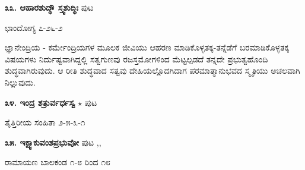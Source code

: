 \medskip
\noindent\textbf{೩೩. ಆಹಾರಶುದ್ಧೌ ಸ್ತ್ವಶುದ್ಧಿಃ} \hfill ಪುಟ \pageref{76}

\hfill ಛಾಂದೋಗ್ಯ ೭-೨೬-೨

ಜ್ಞಾನೇಂದ್ರಿಯ - ಕರ್ಮೇಂದ್ರಿಯಗಳ ಮೂಲಕ ಜೀವಿಯು ಆಹರಣ ಮಾಡಿಕೊಳ್ಳತಕ್ಕ-ತನ್ನೆಡೆಗೆ ಬರಮಾಡಿಕೊಳ್ಳತಕ್ಕ ವಿಷಯಗಳು ನಿರ್ದುಷ್ಟವಾಗಿದ್ದಲ್ಲಿ ಸತ್ವಗುಣವು ರಜಸ್ತಮೋಗಳಿಂದ ಮೆಟ್ಟಲ್ಪಡದೆ ತನ್ನದೇ ಪ್ರಭುತ್ವಹೊಂದಿ ಶುದ್ಧವಾಗಿರುವುದು. ಆ ರೀತಿ ಶುದ್ಧವಾದ ಸತ್ವವು ದೇಹಿಯಲ್ಲೊದಗಿದಾಗ ಪರಮಾತ್ಮಾನುಭವದ ಸ್ಮೃತಿಯು ಅಚಲವಾಗಿ ನಿಲ್ಲುವುದು.

\medskip
\noindent\textbf{೩೪. ಇಂದ್ರ  ಶತ್ರುರ್ವರ್ಧಸ್ವ} $\star$ \hfill ಪುಟ \pageref{9}

\hfill ತೈತ್ತಿರೀಯ ಸಂಹಿತಾ ೨-೫-೩-೧

\medskip
\noindent\textbf{೩೫. ಇಕ್ಷ್ವಾಕುವಂಶಪ್ರಭುವೋ} \hfill ಪುಟ \pageref{154},\pageref{163},\pageref{196}

\hfill ರಾಮಾಯಣ ಬಾಲಕಂಡ ೧-೮ ರಿಂದ ೧೮

